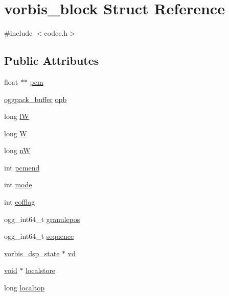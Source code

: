\hypertarget{structvorbis__block}{}\section{vorbis\+\_\+block Struct Reference}
\label{structvorbis__block}


{\ttfamily \#include $<$codec.\+h$>$}

\subsection*{Public Attributes}
\begin{DoxyCompactItemize}
\item 
float $\ast$$\ast$ \mbox{\hyperlink{structvorbis__block_ac8312d70a6e63afc01d3df8a54ac6508}{pcm}}
\item 
\mbox{\hyperlink{structoggpack__buffer}{oggpack\+\_\+buffer}} \mbox{\hyperlink{structvorbis__block_a43f1746974a729fa4e835ef995f9782a}{opb}}
\item 
long \mbox{\hyperlink{structvorbis__block_a97675088561ed9aa4559e869aafd1f2c}{lW}}
\item 
long \mbox{\hyperlink{structvorbis__block_a1e420440dd6a5a39262c0fe7afa8435a}{W}}
\item 
long \mbox{\hyperlink{structvorbis__block_a6fa002c8c36ad39c1c015cfa673dda28}{nW}}
\item 
int \mbox{\hyperlink{structvorbis__block_a946562a7fdb80cabf6ee749bdce1a0ed}{pcmend}}
\item 
int \mbox{\hyperlink{structvorbis__block_adab44bb8520c9d5daafee3f1a1bcf538}{mode}}
\item 
int \mbox{\hyperlink{structvorbis__block_a7bc1252bc17a2cd1ee2a4154fdd2617b}{eofflag}}
\item 
ogg\+\_\+int64\+\_\+t \mbox{\hyperlink{structvorbis__block_a3dc7d5e474ae80ea641df91eba16b490}{granulepos}}
\item 
ogg\+\_\+int64\+\_\+t \mbox{\hyperlink{structvorbis__block_a09e48c70ae79cae2d37a4e0e55f294ef}{sequence}}
\item 
\mbox{\hyperlink{structvorbis__dsp__state}{vorbis\+\_\+dsp\+\_\+state}} $\ast$ \mbox{\hyperlink{structvorbis__block_adefe79be61ef3631c18cd7b8afae31a2}{vd}}
\item 
\mbox{\hyperlink{_s_d_l__opengles2__gl2ext_8h_ae5d8fa23ad07c48bb609509eae494c95}{void}} $\ast$ \mbox{\hyperlink{structvorbis__block_a457093b574de4317ae1b2505a868a5fb}{localstore}}
\item 
long \mbox{\hyperlink{structvorbis__block_a5d207139360d9fa6c825ebca553ae984}{localtop}}
$$
\end{DoxyCompactItemize}
